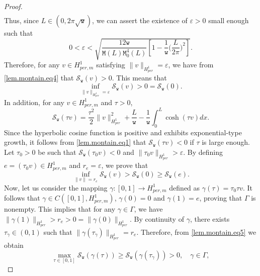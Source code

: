 \documentclass[12pt,reqno,a4paper]{amsart} %
\numberwithin{equation}{section}
\numberwithin{figure}{section}
\begin{document}
\begin{proof}
\begin{equation}
\begin{array}{llllllll}
 	\end{array}\end{equation}
 	Thus, since $L\in(0,2\pi \sqrt{\mathtt{w}})$, we can assert the existence of $\varepsilon>0$ small enough such that
 	\begin{equation}
 		0<	\varepsilon<\sqrt{\frac{12\mathtt{w}}{\mathtt{M}(L)\mathtt{M}_0^4(L)}\left[1 - \frac{1}{\mathtt{w}}\biggl(\frac{L}{2\pi}\biggl)^2	 \right]}.
 	\end{equation}
 	\indent Therefore, for any $ v\in H^1_{per,m}$ satisfying $\|v\| _{H^1_{per}}=\varepsilon$, we have from \eqref{lem.montain.eq4} that $	\mathcal{S}_\mathtt{w}(v) > 0$. This means that 
 	\begin{equation}\label{lem.montain.eq5}
 		\displaystyle	\inf_{\|v\|_{H^1_{per}}=\varepsilon} \mathcal{S}_\mathtt{w}(v)>0=\mathcal{S}_\mathtt{w}(0).
 	\end{equation}
 	In addition, for any $v\in H^1_{per,m}$ and $\tau>0$, 
 	\begin{equation}\label{lem.montain.eq1}
 		\mathcal{S}_\mathtt{w} (\tau v)=\frac{\tau^2}{2} \|v\|^2_{H^1_{per}}+\frac{L}{\mathtt{w}}-\frac{1}{\mathtt{w}}\int_{0}^{L}\cosh(\tau v)dx.
 	\end{equation}
 	Since the hyperbolic cosine function is positive and exhibits exponential-type growth, it follows from \eqref{lem.montain.eq1} that $	\mathcal{S}_\mathtt{w} (\tau v)<0$ if $\tau$ is large enough. Let $\tau_0>0$ be such that  $	\mathcal{S}_\mathtt{w} (\tau_0 v)<0$ and $\|\tau_0v\|_{H^1_{per}}>\varepsilon$. By defining $e=(\tau_0 v) \in H^1_{per,m}$ and $\displaystyle r_e=\varepsilon$, we prove that	   	 	\begin{equation}\label{lem.montain.eq1'} \inf_{\|v\|=r_e}\mathcal{S}_\mathtt{w}(v)>\mathcal{S}_\mathtt{w}(0)\ge \mathcal{S}_\mathtt{w}(e). 
 	\end{equation}
 	\indent Now, let us consider the mapping
 	$\gamma:[0,1]\to H^1_{per,m}$ defined as $\gamma(\tau)=\tau_0 \tau v$. It follows that $\gamma\in C([0,1], H^1_{per,m})$, $\gamma(0)=0$ and $\gamma(1)=e$, proving that $\Gamma$ is nonempty. 	   
 	This implies that for any $\gamma\in \Gamma$, we have $\|\gamma(1)\|_{H^1_{per}} >r_e>0=\|\gamma(0)\|_{H^1_{per}}$. By continuity of $\gamma$, there exists $\tau _\gamma\in (0,1)$ such that $\|\gamma(\tau_ \gamma)\|_{H^1_{per}} =r_e$. Therefore, from \eqref{lem.montain.eq5} we obtain
 	\begin{equation}
 		\max_{\tau\in [0,1]}\mathcal{S}_\mathtt{w}(\gamma(\tau))\ge\mathcal{S}_\mathtt{w}(\gamma(\tau_\gamma))>0, \quad \gamma\in \Gamma,

\end{equation}
\end{proof}
\end{document}
